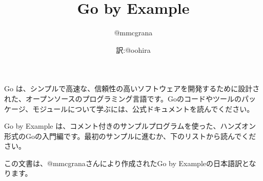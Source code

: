 \title{Go by Example}
\author{@mmcgrana \and 訳:@oohira}

\maketitle

Go は、シンプルで高速な、信頼性の高いソフトウェアを開発するために設計された、オープンソースのプログラミング言語です。Goのコードやツールのパッケージ、モジュールについて学ぶには、公式ドキュメントを読んでください。

Go by Example は、コメント付きのサンプルプログラムを使った、ハンズオン形式のGoの入門編です。最初のサンプルに進むか、下のリストから読んでください。

この文書は、@mmcgranaさんにより作成されたGo by Exampleの日本語訳となります。

